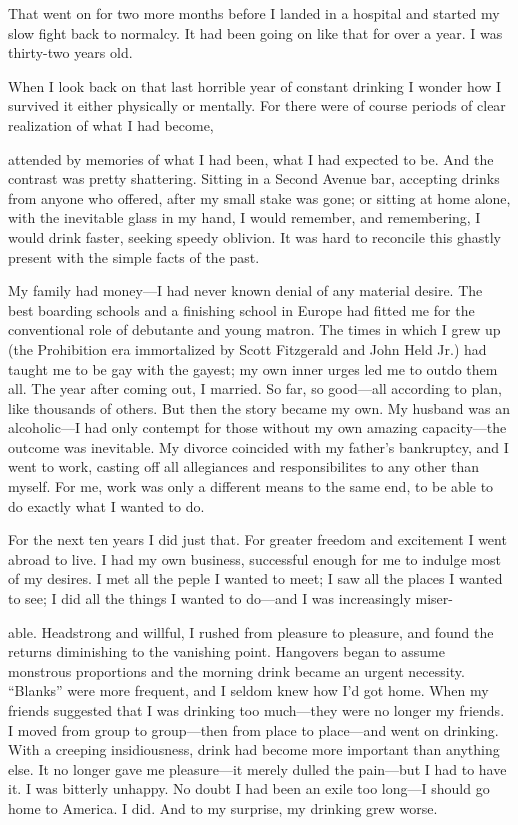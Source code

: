 \begin{biblechapter}
That went on for two more months before I landed in a hospital and started my slow fight back to normalcy. It had been going on like that for over a year. I was thirty-two years old.

When I look back on that last horrible year of constant drinking I wonder how I survived it either physically or mentally. For there were of course periods of clear realization of what I had become,

attended by memories of what I had been, what I had expected to be. And the contrast was pretty shattering. Sitting in a Second Avenue bar, accepting drinks from anyone who offered, after my small stake was gone; or sitting at home alone, with the inevitable glass in my hand, I would remember, and remembering, I would drink faster, seeking speedy oblivion. It was hard to reconcile this ghastly present with the simple facts of the past.

My family had money—I had never known denial of any material desire. The best boarding schools and a finishing school in Europe had fitted me for the conventional role of debutante and young matron. The times in which I grew up (the Prohibition era immortalized by Scott Fitzgerald and John Held Jr.) had taught me to be gay with the gayest; my own inner urges led me to outdo them all. The year after coming out, I married. So far, so good—all according to plan, like thousands of others. But then the story became my own. My husband was an alcoholic—I had only contempt for those without my own amazing capacity—the outcome was inevitable. My divorce coincided with my father’s bankruptcy, and I went to work, casting off all allegiances and responsibilites to any other than myself. For me, work was only a different means to the same end, to be able to do exactly what I wanted to do.

For the next ten years I did just that. For greater freedom and excitement I went abroad to live. I had my own business, successful enough for me to indulge most of my desires. I met all the peple I wanted to meet; I saw all the places I wanted to see; I did all the things I wanted to do—and I was increasingly miser-

able. Headstrong and willful, I rushed from pleasure to pleasure, and found the returns diminishing to the vanishing point. Hangovers began to assume monstrous proportions and the morning drink became an urgent necessity. “Blanks” were more frequent, and I seldom knew how I’d got home. When my friends suggested that I was drinking too much—they were no longer my friends. I moved from group to group—then from place to place—and went on drinking. With a creeping insidiousness, drink had become more important than anything else. It no longer gave me pleasure—it merely dulled the pain—but I had to have it. I was bitterly unhappy. No doubt I had been an exile too long—I should go home to America. I did. And to my surprise, my drinking grew worse.


\end{biblechapter}
